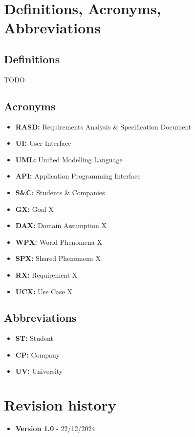 \section{Definitions, Acronyms, Abbreviations}
\label{sec:definitions_acronyms_abbreviations}%

\subsection{Definitions}
\label{subsec:definitions}%
\begin{itemize}
TODO
\end{itemize}


\subsection{Acronyms}
\label{subsec:acronyms}%
\begin{itemize}
    \item \textbf{RASD:} Requirements Analysis \& Specification Document 
    \item \textbf{UI:} User Interface
    \item \textbf{UML:} Unified Modelling Language
    \item \textbf{API:} Application Programming Interface
    \item \textbf{S\&C:} Students \& Companies
    \item \textbf{GX:} Goal X
    \item \textbf{DAX:} Domain Assumption X 
    \item \textbf{WPX:} World Phenomena X
    \item \textbf{SPX:} Shared Phenomena X
    \item \textbf{RX:} Requirement X
    \item \textbf{UCX:} Use Case X
\end{itemize}


\subsection{Abbreviations}
\label{subsec:abbreviations}%
\begin{itemize}
    \item \textbf{ST:} Student
    \item \textbf{CP:} Company
    \item \textbf{UV:} University
\end{itemize}


\section{Revision history}
\label{sec:revision_history}%
\begin{itemize}
    \item \textbf{Version 1.0} - 22/12/2024
\end{itemize}


